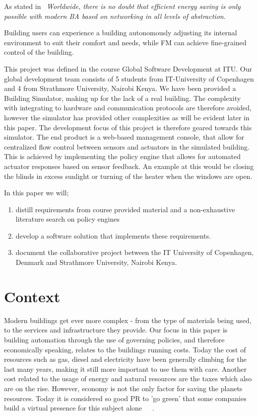 As stated in~\cite{ba-short} \textit{Worldwide, there is no doubt that efficient energy saving is only possible with modern BA based on networking in all levels of abstraction}.

Building users can experience a building autonomously adjusting its internal environment to suit their comfort and needs, while FM can achieve fine-grained control of the building.

This project was defined in the course Global Software Development at ITU. Our global development team consists of 5 students from IT-University of Copenhagen and 4 from Strathmore University, Nairobi Kenya. We have been provided a Building Simulator, making up for the lack of a real building. The complexity with integrating to hardware and communication protocols are therefore avoided, however the simulator has provided other complexities as will be evident later in this paper. The development focus of this project is therefore geared towards this simulator. The end product is a web-based management console, that allow for centralized flow control between sensors and actuators in the simulated building. This is achieved by implementing the policy engine that allows for automated actuator responses based on sensor feedback. An example at this would be closing the blinds in excess sunlight or turning of the heater when the windows are open.

In this paper we will; 
\begin{enumerate}
	\item distill requirements from course provided material and a non-exhaustive literature search on policy engines
	\item develop a software solution that implements these requirements.
	\item document the collaborative project between the IT University of Copenhagen, Denmark and Strathmore University, Nairobi Kenya.
\end{enumerate}

\section{Context}
Modern buildings get ever more complex - from the type of materials being used, to the services and infrastructure they provide. Our focus in this paper is building automation through the use of governing policies, and therefore economically speaking, relates to the buildings running costs. Today the cost of resources such as gas, diesel and electricity have been generally climbing for the last many years, making it still more important to use them with care. Another cost related to the usage of energy and natural resources are the taxes which also are on the rise. However, economy is not the only factor for saving the planets resources. Today it is considered so good PR to 'go green' that some companies build a virtual presence for this subject alone~\cite{green-google}~\cite{green-facebook}~\cite{green-microsoft}.

